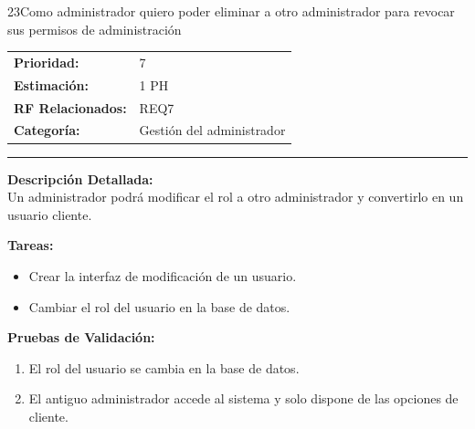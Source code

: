 \begin{hu_card}{23}{Como administrador quiero poder eliminar a otro administrador para revocar sus permisos de administración}
    \begin{tabularx}{\linewidth}{l X}
        \textbf{Prioridad:}   & 7\\
        \textbf{Estimación:}  & 1 PH \\
        \textbf{RF Relacionados:} & REQ7 \\
        \textbf{Categoría:} & Gestión del administrador \\
    \end{tabularx}

    \vspace{2mm}
    \hrule
    \vspace{2mm}

    \textbf{Descripción Detallada:} \\
    Un administrador podrá modificar el rol a otro administrador y convertirlo en un usuario cliente.

    \vspace{2mm}
    \textbf{Tareas:}
    \begin{itemize}[noitemsep, topsep=0pt]
        \item Crear la interfaz de modificación de un usuario.
        \item Cambiar el rol del usuario en la base de datos.
    \end{itemize}

    \vspace{2mm}
    \textbf{Pruebas de Validación:}
    \begin{enumerate}[noitemsep, topsep=0pt]
        \item El rol del usuario se cambia en la base de datos.
        \item El antiguo administrador accede al sistema y solo dispone de las opciones de cliente.
    \end{enumerate}
\end{hu_card}

